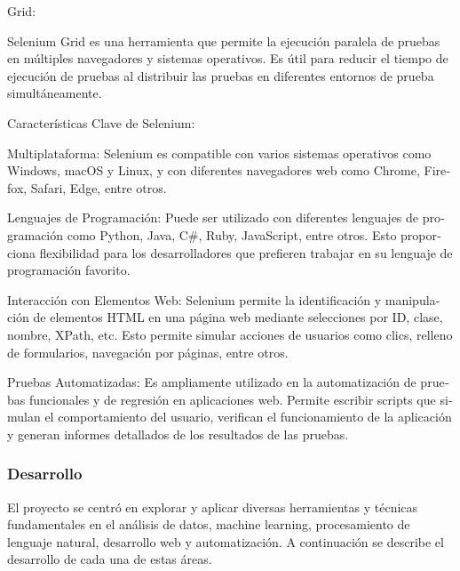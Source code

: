 \documentclass[letterpaper]{article}
\begin{document}
{
\foreignlanguage{spanish}{Grid:}}

{
\foreignlanguage{spanish}{Selenium Grid es una herramienta que permite la ejecución paralela de pruebas en múltiples
navegadores y sistemas operativos. Es útil para reducir el tiempo de ejecución de pruebas al distribuir las pruebas en
diferentes entornos de prueba simultáneamente.}}

{
\foreignlanguage{spanish}{Características Clave de Selenium:}}

{
\foreignlanguage{spanish}{Multiplataforma: Selenium es compatible con varios sistemas operativos como Windows, macOS y
Linux, y con diferentes navegadores web como Chrome, Firefox, Safari, Edge, entre otros.}}

{
\foreignlanguage{spanish}{Lenguajes de Programación: Puede ser utilizado con diferentes lenguajes de programación como
Python, Java, C\#, Ruby, JavaScript, entre otros. Esto proporciona flexibilidad para los desarrolladores que prefieren
trabajar en su lenguaje de programación favorito.}}

{
\foreignlanguage{spanish}{Interacción con Elementos Web: Selenium permite la identificación y manipulación de elementos
HTML en una página web mediante selecciones por ID, clase, nombre, XPath, etc. Esto permite simular acciones de
usuarios como clics, relleno de formularios, navegación por páginas, entre otros.}}

{
\foreignlanguage{spanish}{Pruebas Automatizadas: Es ampliamente utilizado en la automatización de pruebas funcionales y
de regresión en aplicaciones web. Permite escribir scripts que simulan el comportamiento del usuario, verifican el
funcionamiento de la aplicación y generan informes detallados de los resultados de las pruebas.}}
\bigskip
\bigskip
\bigskip
\bigskip
\bigskip
\bigskip
\bigskip
\bigskip\bigskip
\bigskip
\bigskip
\bigskip
\bigskip
\bigskip
\bigskip
\bigskip
\bigskip
\bigskip
\bigskip
\bigskip
\bigskip
\bigskip
\bigskip
\bigskip
\bigskip
\bigskip
\bigskip
\bigskip
\bigskip
\bigskip

\subsubsection{Desarrollo}
{
El proyecto se centró en explorar y aplicar diversas herramientas y técnicas fundamentales en el análisis de datos,
machine learning, procesamiento de lenguaje natural, desarrollo web y automatización. A continuación se describe el
desarrollo de cada una de estas áreas.}
\end{document}
